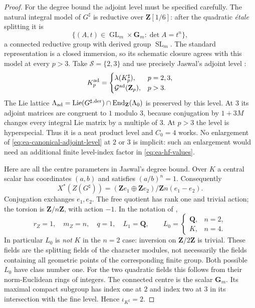 \documentclass[11pt]{article}
\theoremstyle{definition}
\theoremstyle{remark}
\begin{document}
\begin{proof}
For the degree bound the adjoint level must be specified carefully.
The natural integral model of $G^\sharp$ is reductive over
$\mathbf Z[1/6]$: after the quadratic \emph{\'etale} splitting it is
\[
       \{(A,t)\in\operatorname{GL}_m\times\mathbf G_m:
                                      \det A=t^n\},
\]
a connected reductive group with derived group $\operatorname{SL}_m$.
The standard representation is a closed immersion, so its schematic
closure agrees with this model at every $p>3$.
Take $\mathcal S=\{2,3\}$ and use precisely Jaswal's adjoint level
\cite[\S9.1, Lemma~9.2]{Jaswal}:
\begin{equation}\label{eq:ea-canonical-adjoint-level}
 K^{\rm ad}_p=\begin{cases}
       \lambda(K^\sharp_p),&p=2,3,\\
       \mathcal G^{\rm ad}(\mathbf Z_p),&p>3.
                      \end{cases}
\end{equation}
The Lie lattice
$\Lambda_{\rm ad}=\operatorname{Lie}(G^{\sharp,\rm der})
                   \cap\operatorname{End}_{\mathbf Z}(\Lambda_0)$
is preserved by this level.  At $3$ its adjoint matrices are congruent
to $1$ modulo $3$, because conjugation by $1+3M$ changes every integral
Lie matrix by a multiple of $3$.  At $p>3$ the level is hyperspecial.
Thus it is a neat product level and $C_0=4$ works.  No enlargement of
\eqref{eq:ea-canonical-adjoint-level} at $2$ or $3$ is implicit: such an
enlargement would need an additional finite level-index factor in
\eqref{eq:ea-hf-values}.

Here are all the centre parameters in Jaswal's degree bound.  Over $K$
a central scalar has coordinates $(a,b)$ and satisfies $(a/b)^n=1$.
Consequently
\[
 X^*(Z(G^\sharp))=
      (\mathbf Ze_1\oplus\mathbf Ze_2)/\mathbf Z n(e_1-e_2).
\]
Conjugation exchanges $e_1,e_2$.  The free quotient has rank one and
trivial action; the torsion is $\mathbf Z/n\mathbf Z$, with action
$-1$.  In the notation of \cite[\S9.3]{Jaswal},
\[
 r_Z=1,\quad m_Z=n,\quad q=1,\quad L_1=\mathbf Q,\qquad
 L_0=\begin{cases}\mathbf Q,&n=2,\\K,&n=4.\end{cases}
\]
In particular $L_0$ is \emph{not} $K$ in the $n=2$ case: inversion
on $\mathbf Z/2\mathbf Z$ is trivial.  These fields are the splitting
fields of the character modules, not necessarily the fields containing
all geometric points of the corresponding finite group.
Both possible $L_0$ have class number one.  For the two quadratic
fields this follows from their norm-Euclidean rings of integers.
The connected centre is the scalar $\mathbf G_m$.  Its maximal compact
subgroup has index one at $2$ and index two at $3$ in its intersection
with the fine level.  Hence $\iota_{K^\sharp}=2$.


\end{proof}
\end{document}
